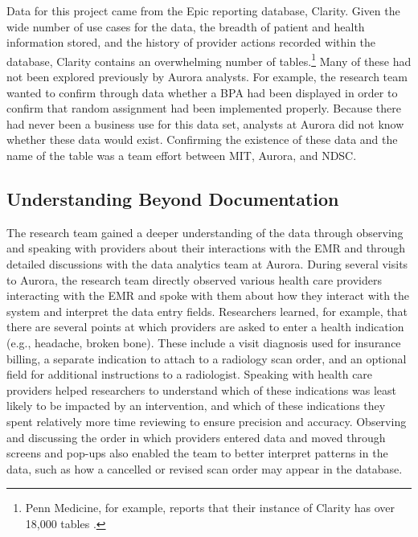 Data for this project came from the Epic reporting database, Clarity. Given the wide number of use cases for the data, the breadth of patient and health information stored, and the history of provider actions recorded within the database, Clarity contains an overwhelming number of tables.\footnote{Penn Medicine, for example, reports that their instance of Clarity has over 18,000 tables \citep{pennmedicineinformationsystemsdataanalyticscenter}.} Many of these had not been explored previously by Aurora analysts. For example, the research team wanted to confirm through data whether a BPA had been displayed in order to confirm that random assignment had been implemented properly. Because there had never been a business use for this data set, analysts at Aurora did not know whether these data would exist. Confirming the existence of these data and the name of the table was a team effort between MIT, Aurora, and NDSC.

\hypertarget{understanding-beyond-documentation}{%
\subsection{Understanding Beyond Documentation}\label{understanding-beyond-documentation}}

The research team gained a deeper understanding of the data through observing and speaking with providers about their interactions with the EMR and through detailed discussions with the data analytics team at Aurora. During several visits to Aurora, the research team directly observed various health care providers interacting with the EMR and spoke with them about how they interact with the system and interpret the data entry fields. Researchers learned, for example, that there are several points at which providers are asked to enter a health indication (e.g., headache, broken bone). These include a visit diagnosis used for insurance billing, a separate indication to attach to a radiology scan order, and an optional field for additional instructions to a radiologist. Speaking with health care providers helped researchers to understand which of these indications was least likely to be impacted by an intervention, and which of these indications they spent relatively more time reviewing to ensure precision and accuracy. Observing and discussing the order in which providers entered data and moved through screens and pop-ups also enabled the team to better interpret patterns in the data, such as how a cancelled or revised scan order may appear in the database.

